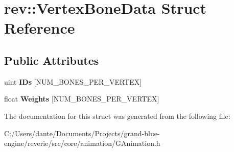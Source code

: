 \hypertarget{structrev_1_1_vertex_bone_data}{}\section{rev\+::Vertex\+Bone\+Data Struct Reference}
\label{structrev_1_1_vertex_bone_data}
\subsection*{Public Attributes}
\begin{DoxyCompactItemize}
\item 
\mbox{\label{structrev_1_1_vertex_bone_data_a4baa9a84084194d8a8e343908106f514}} 
uint {\bfseries I\+Ds} \mbox{[}N\+U\+M\+\_\+\+B\+O\+N\+E\+S\+\_\+\+P\+E\+R\+\_\+\+V\+E\+R\+T\+EX\mbox{]}
\item 
\mbox{\label{structrev_1_1_vertex_bone_data_a6182fd5b73fa080ccc134589b3aff347}} 
float {\bfseries Weights} \mbox{[}N\+U\+M\+\_\+\+B\+O\+N\+E\+S\+\_\+\+P\+E\+R\+\_\+\+V\+E\+R\+T\+EX\mbox{]}
\end{DoxyCompactItemize}


The documentation for this struct was generated from the following file\+:\begin{DoxyCompactItemize}
\item 
C\+:/\+Users/dante/\+Documents/\+Projects/grand-\/blue-\/engine/reverie/src/core/animation/G\+Animation.\+h\end{DoxyCompactItemize}
